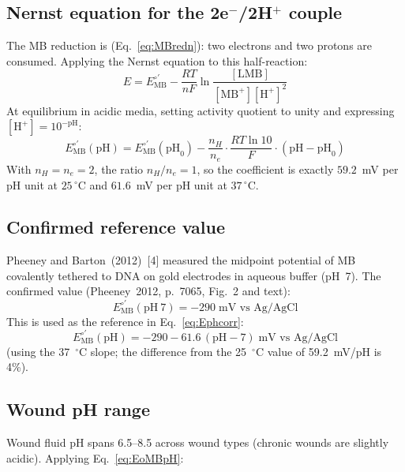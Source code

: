 \documentclass[10pt,a4paper]{article}
\numberwithin{equation}{section}
\newcommand{\cit}[1]{[#1]}
\newcommand{\Eo}{E^{\circ\prime}}
\begin{document}
\subsection{Nernst equation for the 2e$^-$/2H$^+$ couple}

The MB reduction is (Eq.~\ref{eq:MBredn}): two electrons and two
protons are consumed. Applying the Nernst equation to this half-reaction:
\begin{equation}
  E = \Eo_{\text{MB}} - \frac{RT}{nF}\ln\frac{[\text{LMB}]}{[\text{MB}^+][\text{H}^+]^2}
  \label{eq:nernst_full}
\end{equation}
At equilibrium in acidic media, setting activity quotient to unity
and expressing $[\text{H}^+] = 10^{-\text{pH}}$:
\begin{equation}
  \Eo_{\text{MB}}(\text{pH}) = \Eo_{\text{MB}}(\text{pH}_0)
  - \frac{n_H}{n_e}\cdot\frac{RT\ln10}{F}\cdot(\text{pH} - \text{pH}_0)
  \label{eq:Ephcorr}
\end{equation}
With $n_H = n_e = 2$, the ratio $n_H/n_e = 1$, so the coefficient
is exactly $59.2$~mV per pH unit at $25\,^\circ$C and $61.6$~mV per
pH unit at $37\,^\circ$C.

\subsection{Confirmed reference value}

Pheeney and Barton~(2012)~\cit{4} measured the midpoint potential of
MB covalently tethered to DNA on gold electrodes in aqueous buffer
(pH~7). The confirmed value (Pheeney~2012, p.~7065, Fig.~2 and text):
\begin{equation}
  \Eo_{\text{MB}}(\text{pH}~7) = -290\;\text{mV vs Ag/AgCl}
  \label{eq:EoMBpH7}
\end{equation}
This is used as the reference in Eq.~\eqref{eq:Ephcorr}:
\begin{equation}
  \Eo_{\text{MB}}(\text{pH}) = -290 - 61.6\,(\text{pH} - 7)\;\text{mV vs Ag/AgCl}
  \label{eq:EoMBpH}
\end{equation}
(using the 37~$^\circ$C slope; the difference from the 25~$^\circ$C
value of 59.2~mV/pH is 4\%).

\subsection{Wound pH range}

Wound fluid pH spans 6.5--8.5 across wound types (chronic wounds are
slightly acidic). Applying Eq.~\eqref{eq:EoMBpH}:
\end{document}
